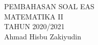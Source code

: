 \documentclass{article}
\begin{document}
 \begin{titlepage}
    \vspace*{\fill}
    \begin{center}
      \Huge {PEMBAHASAN SOAL EAS \\ MATEMATIKA II \\ TAHUN 2020/2021}\\[0.4 cm]
      \huge {Ahmad Hisbu Zakiyudin}
    \end{center}
    \vspace*{\fill}
  \end{titlepage}
\makeatletter
\renewcommand*\env@matrix[1][*\c@MaxMatrixCols c]{%
  \hskip -\arraycolsep
  \let\@ifnextchar\new@ifnextchar
  \array{#1}}
\makeatother
\newcount\arrowcount
\newcommand\arrows[1]{
        \global\arrowcount#1
        \ifnum\arrowcount>0
                \begin{matrix}[c]
                \expandafter\nextarrow
        \fi
}

\newcommand\nextarrow[1]{
        \global\advance\arrowcount-1
        \ifx\relax#1\relax\else \xrightarrow{#1}\fi
        \ifnum\arrowcount=0
                \end{matrix}
        \else
                \\
                \expandafter\nextarrow
        \fi
}
\newpage
{}
\end{document}
